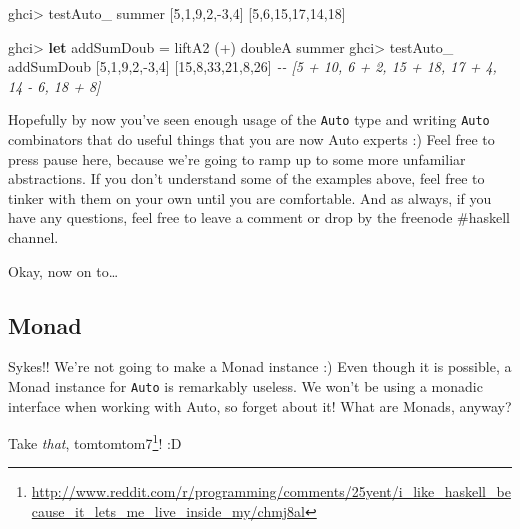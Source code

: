 \documentclass[]{article}
\newenvironment{Shaded}{}{}
\newcommand{\CommentTok}[1]{\textcolor[rgb]{0.38,0.63,0.69}{\textit{#1}}}
\newcommand{\DecValTok}[1]{\textcolor[rgb]{0.25,0.63,0.44}{#1}}
\newcommand{\KeywordTok}[1]{\textcolor[rgb]{0.00,0.44,0.13}{\textbf{#1}}}
\newcommand{\NormalTok}[1]{#1}
\newcommand{\OperatorTok}[1]{\textcolor[rgb]{0.40,0.40,0.40}{#1}}
\newcommand{\OtherTok}[1]{\textcolor[rgb]{0.00,0.44,0.13}{#1}}
\renewcommand{\href}[2]{#2\footnote{\url{#1}}}
\begin{document}
\begin{Shaded}
\begin{Highlighting}[]
\NormalTok{ghci}\OperatorTok{\textgreater{}}\NormalTok{ testAuto\_ summer [}\DecValTok{5}\NormalTok{,}\DecValTok{1}\NormalTok{,}\DecValTok{9}\NormalTok{,}\DecValTok{2}\NormalTok{,}\OperatorTok{{-}}\DecValTok{3}\NormalTok{,}\DecValTok{4}\NormalTok{]}
\NormalTok{[}\DecValTok{5}\NormalTok{,}\DecValTok{6}\NormalTok{,}\DecValTok{15}\NormalTok{,}\DecValTok{17}\NormalTok{,}\DecValTok{14}\NormalTok{,}\DecValTok{18}\NormalTok{]}

\NormalTok{ghci}\OperatorTok{\textgreater{}} \KeywordTok{let}\NormalTok{ addSumDoub }\OtherTok{=}\NormalTok{ liftA2 (}\OperatorTok{+}\NormalTok{) doubleA summer}
\NormalTok{ghci}\OperatorTok{\textgreater{}}\NormalTok{ testAuto\_ addSumDoub [}\DecValTok{5}\NormalTok{,}\DecValTok{1}\NormalTok{,}\DecValTok{9}\NormalTok{,}\DecValTok{2}\NormalTok{,}\OperatorTok{{-}}\DecValTok{3}\NormalTok{,}\DecValTok{4}\NormalTok{]}
\NormalTok{[}\DecValTok{15}\NormalTok{,}\DecValTok{8}\NormalTok{,}\DecValTok{33}\NormalTok{,}\DecValTok{21}\NormalTok{,}\DecValTok{8}\NormalTok{,}\DecValTok{26}\NormalTok{]}
\CommentTok{{-}{-} [5 + 10, 6 + 2, 15 + 18, 17 + 4, 14 {-} 6, 18 + 8]}
\end{Highlighting}
\end{Shaded}

Hopefully by now you've seen enough usage of the \texttt{Auto} type and writing
\texttt{Auto} combinators that do useful things that you are now Auto experts :)
Feel free to press pause here, because we're going to ramp up to some more
unfamiliar abstractions. If you don't understand some of the examples above,
feel free to tinker with them on your own until you are comfortable. And as
always, if you have any questions, feel free to leave a comment or drop by the
freenode \#haskell channel.

Okay, now on to\ldots{}

\subsection{Monad}\label{monad}

Sykes!! We're not going to make a Monad instance :) Even though it is possible,
a Monad instance for \texttt{Auto} is remarkably useless. We won't be using a
monadic interface when working with Auto, so forget about it! What are Monads,
anyway?

Take \emph{that},
\href{http://www.reddit.com/r/programming/comments/25yent/i_like_haskell_because_it_lets_me_live_inside_my/chmj8al}{tomtomtom7}!
:D
\end{document}
